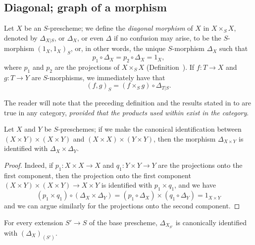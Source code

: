 \subsection{Diagonal; graph of a morphism}
\label{subsection:I.5.3}

\begin{env}[5.3.1]
\label{I.5.3.1}
Let $X$ be an $S$-prescheme;
we define the \emph{diagonal morphism} of $X$ in $X\times_S X$, denoted by $\Delta_{X|S}$, or $\Delta_X$, or even $\Delta$ if no confusion may arise, to be the $S$-morphism $(1_X,1_X)_S$, or, in other words, the unique $S$-morphism $\Delta_X$ such that
\[
\label{I.5.3.1.1}
  p_1\circ\Delta_X=p_2\circ\Delta_X=1_X,
  \tag{5.3.1.1}
\]
where $p_1$ and $p_2$ are the projections of $X\times_S X$ (Definition~).
If $f:T\to X$ and $g:T\to Y$ are $S$-morphisms, we immediately have that
\[
\label{I.5.3.1.2}
  (f,g)_S=(f\times_S g)\circ\Delta_{T|S}.
  \tag{5.3.1.2}
\]

The reader will note that the preceding definition and the results stated in  to  are true in any category, \emph{provided that the products used within exist in the category}.
\end{env}

\begin{proposition}[5.3.2]
\label{I.5.3.2}
Let $X$ and $Y$ be $S$-preschemes;
if we make the canonical identification between $(X\times Y)\times(X\times Y)$ and $(X\times X)\times(Y\times Y)$, then the morphism $\Delta_{X\times Y}$ is identified with $\Delta_X\times\Delta_Y$.
\end{proposition}

\begin{proof}
Indeed, if $p_1:X\times X\to X$ and $q_1:Y\times Y\to Y$ are the projections onto the first component, then the projection onto the first component $(X\times Y)\times(X\times Y)\to X\times Y$ is identified with $p_1\times q_1$, and we have
\[
  (p_1\times q_1)\circ(\Delta_X\times\Delta_Y)=(p_1\circ\Delta_X)\times(q_1\circ\Delta_Y)=1_{X\times Y}
\]
and we can argue similarly for the projections onto the second component.
\end{proof}

\begin{env}
\label{I.5.3.3}
\end{env}

\begin{corollary}[5.3.4]
\label{I.5.3.4}
For every extension $S'\to S$ of the base prescheme, $\Delta_{X_{S'}}$ is canonically identified with $(\Delta_X)_{(S')}$.
\end{corollary}

